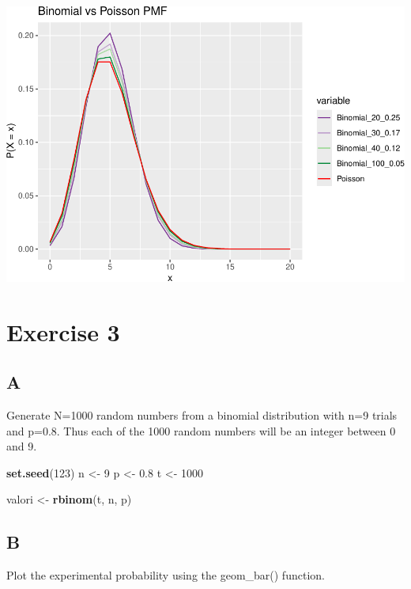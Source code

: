 \documentclass[
]{article}
\newenvironment{Shaded}{\begin{snugshade}}{\end{snugshade}}
\newcommand{\DecValTok}[1]{\textcolor[rgb]{0.00,0.00,0.81}{#1}}
\newcommand{\FloatTok}[1]{\textcolor[rgb]{0.00,0.00,0.81}{#1}}
\newcommand{\KeywordTok}[1]{\textcolor[rgb]{0.13,0.29,0.53}{\textbf{#1}}}
\newcommand{\NormalTok}[1]{#1}
\newcommand{\StringTok}[1]{\textcolor[rgb]{0.31,0.60,0.02}{#1}}
\begin{document}
\includegraphics{es_files/figure-latex/unnamed-chunk-12-1.pdf}

\hypertarget{exercise-3}{%
\section{Exercise 3}\label{exercise-3}}

\hypertarget{a-2}{%
\subsection{A}\label{a-2}}

Generate N=1000 random numbers from a binomial distribution with n=9
trials and p=0.8. Thus each of the 1000 random numbers will be an
integer between 0 and 9.

\begin{Shaded}
\begin{Highlighting}[]
\KeywordTok{set.seed}\NormalTok{(}\DecValTok{123}\NormalTok{)}
\NormalTok{n \textless{}{-}}\StringTok{ }\DecValTok{9}
\NormalTok{p \textless{}{-}}\StringTok{ }\FloatTok{0.8}
\NormalTok{t \textless{}{-}}\StringTok{ }\DecValTok{1000}

\NormalTok{valori \textless{}{-}}\StringTok{ }\KeywordTok{rbinom}\NormalTok{(t, n, p)}
\end{Highlighting}
\end{Shaded}

\hypertarget{b-2}{%
\subsection{B}\label{b-2}}

Plot the experimental probability using the geom\_bar() function.
\end{document}
